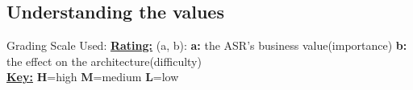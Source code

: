 \subsection{Understanding the values}
Grading Scale Used:\newline
\newline
\underline{\textbf{Rating:}} (a, b):\newline
\textbf{a:} the ASR’s business value(importance)\newline
\textbf{b:} the effect on the architecture(difficulty)\newline
\\
\underline{\textbf{Key:}}\newline
\textbf{H}=high\newline
\textbf{M}=medium\newline
\textbf{L}=low\newline
